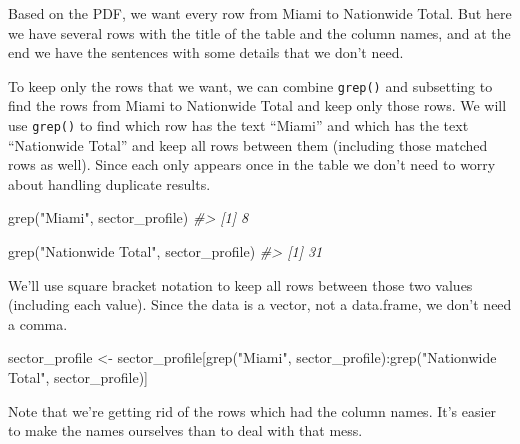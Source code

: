 \documentclass[
  12pt,
]{book}
\newenvironment{Shaded}{\begin{snugshade}}{\end{snugshade}}
\newcommand{\CommentTok}[1]{\textcolor[rgb]{0.37,0.37,0.37}{\textit{#1}}}
\newcommand{\FunctionTok}[1]{\textcolor[rgb]{0,0,0}{#1}}
\newcommand{\NormalTok}[1]{#1}
\newcommand{\OtherTok}[1]{\textcolor[rgb]{0.37,0.37,0.37}{#1}}
\newcommand{\SpecialCharTok}[1]{\textcolor[rgb]{0,0,0}{#1}}
\newcommand{\StringTok}[1]{\textcolor[rgb]{0.5,0.5,0.5}{#1}}
\begin{document}
Based on the PDF, we want every row from Miami to Nationwide Total. But here we have several rows with the title of the table and the column names, and at the end we have the sentences with some details that we don't need.

To keep only the rows that we want, we can combine \texttt{grep()} and subsetting to find the rows from Miami to Nationwide Total and keep only those rows. We will use \texttt{grep()} to find which row has the text ``Miami'' and which has the text ``Nationwide Total'' and keep all rows between them (including those matched rows as well). Since each only appears once in the table we don't need to worry about handling duplicate results.

\begin{Shaded}
\begin{Highlighting}[]
\FunctionTok{grep}\NormalTok{(}\StringTok{"Miami"}\NormalTok{, sector\_profile)}
\CommentTok{\#\textgreater{} [1] 8}
\end{Highlighting}
\end{Shaded}

\begin{Shaded}
\begin{Highlighting}[]
\FunctionTok{grep}\NormalTok{(}\StringTok{"Nationwide Total"}\NormalTok{, sector\_profile)}
\CommentTok{\#\textgreater{} [1] 31}
\end{Highlighting}
\end{Shaded}

We'll use square bracket notation to keep all rows between those two values (including each value). Since the data is a vector, not a data.frame, we don't need a comma.

\begin{Shaded}
\begin{Highlighting}[]
\NormalTok{sector\_profile }\OtherTok{\textless{}{-}}\NormalTok{ sector\_profile[}\FunctionTok{grep}\NormalTok{(}\StringTok{"Miami"}\NormalTok{, sector\_profile)}\SpecialCharTok{:}\FunctionTok{grep}\NormalTok{(}\StringTok{"Nationwide Total"}\NormalTok{, sector\_profile)]}
\end{Highlighting}
\end{Shaded}

Note that we're getting rid of the rows which had the column names. It's easier to make the names ourselves than to deal with that mess.
\end{document}
